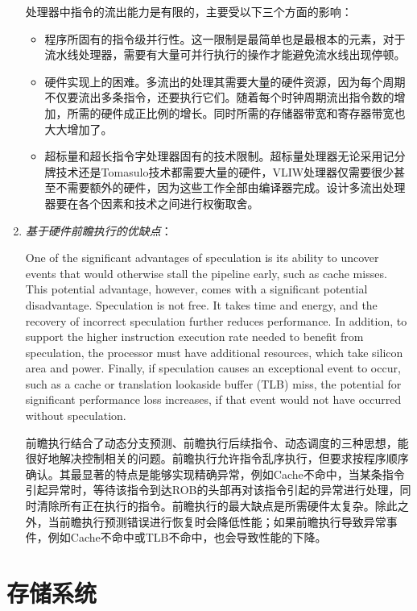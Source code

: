 \documentclass[a4paper]{ctexart}
\begin{document}
\begin{enumerate}
  处理器中指令的流出能力是有限的，主要受以下三个方面的影响：
  \begin{itemize}
    \item 程序所固有的指令级并行性。这一限制是最简单也是最根本的元素，对于流水线处理器，需要有大量可并行执行的操作才能避免流水线出现停顿。
    \item 硬件实现上的困难。多流出的处理其需要大量的硬件资源，因为每个周期不仅要流出多条指令，还要执行它们。随着每个时钟周期流出指令数的增加，所需的硬件成正比例的增长。同时所需的存储器带宽和寄存器带宽也大大增加了。
    \item 超标量和超长指令字处理器固有的技术限制。超标量处理器无论采用记分牌技术还是Tomasulo技术都需要大量的硬件，VLIW处理器仅需要很少甚至不需要额外的硬件，因为这些工作全部由编译器完成。设计多流出处理器要在各个因素和技术之间进行权衡取舍。
  \end{itemize}
  
  \item \emph{基于硬件前瞻执行的优缺点}：
  
  One of the significant advantages of speculation is its ability to uncover events that would otherwise stall the pipeline early, such as cache misses. This potential advantage, however, comes with a significant potential disadvantage. Speculation is not free. It takes time and energy, and the recovery of incorrect speculation further reduces performance. In addition, to support the higher instruction execution rate needed to benefit from speculation, the processor must have additional resources, which take silicon area and power. Finally, if speculation causes an exceptional event to occur, such as a cache or translation lookaside buffer (TLB) miss, the potential for significant performance loss increases, if that event would not have occurred without speculation. 
  
  前瞻执行结合了动态分支预测、前瞻执行后续指令、动态调度的三种思想，能很好地解决控制相关的问题。前瞻执行允许指令乱序执行，但要求按程序顺序确认。其最显著的特点是能够实现精确异常，例如Cache不命中，当某条指令引起异常时，等待该指令到达ROB的头部再对该指令引起的异常进行处理，同时清除所有正在执行的指令。前瞻执行的最大缺点是所需硬件太复杂。除此之外，当前瞻执行预测错误进行恢复时会降低性能；如果前瞻执行导致异常事件，例如Cache不命中或TLB不命中，也会导致性能的下降。
  
\end{enumerate}

\newpage
\section{存储系统}
\end{document}
